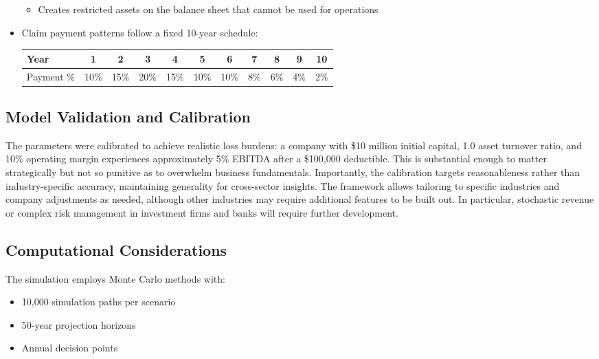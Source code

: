 \documentclass[11pt,letterpaper]{article}
\begin{document}
\begin{itemize}
\begin{itemize}[label=$\circ$]
            \item Creates restricted assets on the balance sheet that cannot be used for operations
        \end{itemize}
    \item Claim payment patterns follow a fixed 10-year schedule:
        \begin{table}[H]
            \centering
            \begin{tabular}{lcccccccccc}
                \toprule
                Year & 1 & 2 & 3 & 4 & 5 & 6 & 7 & 8 & 9 & 10 \\
                \midrule
                Payment \% & 10\% & 15\% & 20\% & 15\% & 10\% & 10\% & 8\% & 6\% & 4\% & 2\% \\
                \bottomrule
            \end{tabular}
            \label{tab:payment_pattern}
        \end{table}
\end{itemize}

\subsection{Model Validation and Calibration}

The parameters were calibrated to achieve realistic loss burdens: a company with \$10 million initial capital, 1.0 asset turnover ratio, and 10\% operating margin experiences approximately 5\% EBITDA after a \$100,000 deductible. This is substantial enough to matter strategically but not so punitive as to overwhelm business fundamentals. Importantly, the calibration targets reasonableness rather than industry-specific accuracy, maintaining generality for cross-sector insights. The framework allows tailoring to specific industries and company adjustments as needed, although other industries may require additional features to be built out. In particular, stochastic revenue or complex risk management in investment firms and banks will require further development.

\subsection{Computational Considerations}

The simulation employs Monte Carlo methods with:
\begin{itemize}
    \item 10,000 simulation paths per scenario
    \item 50-year projection horizons
    \item Annual decision points
\end{itemize}
\end{document}
